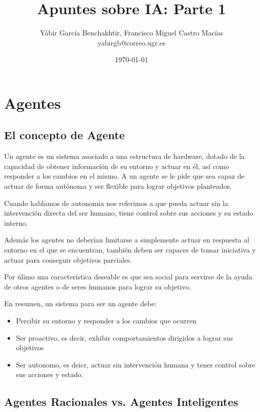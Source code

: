 \documentclass[12pt]{article}
\author{Yábir García Benchakhtir, Francisco Miguel Castro Macías\\yabirgb@correo.ugr.es}
\date{\today}
\title{Apuntes sobre IA: Parte 1}
\begin{document}
\setlength{\parindent}{0cm}
\setlength{\parskip}{3mm}

\maketitle

\section{Agentes}

\subsection{El concepto de Agente}

Un agente es un sistema asociado a una estructura de hardware, dotado
de la capacidad de obtener información de su entorno y actuar en él,
así como responder a los cambios en el mismo. A un agente se le
pide que sea capaz de actuar de forma autónoma y ser flexible para
lograr objetivos planteados.

Cuando hablamos de autonomia nos referimos a que pueda actuar sin la
intervención directa del ser humano, tiene control sobre sus acciones
y su estado interno.

Además los agentes no deberían limitarse a simplemente actuar en
respuesta al entorno en el que se encuentran, también deben ser
capaces de tomar iniciativa y actuar para conseguir objetivos
parciales.

Por úlimo una característica deseable es que sea social para servirse
de la ayuda de otros agentes o de seres humanos para lograr su objetivo.

En resumen, un sistema para ser un agente debe:

\begin{itemize}
\item Percibir su entorno y responder a los cambios que ocurren
\item Ser proactivo, es decir, exhibir comportamientos dirigidos a lograr sus objetivos
\item Ser autonomo, es deicr, actuar sin intervención humana y tener
  control sobre sus acciones y estado.
\end{itemize}

\subsection{Agentes Racionales vs. Agentes Inteligentes}
\end{document}
